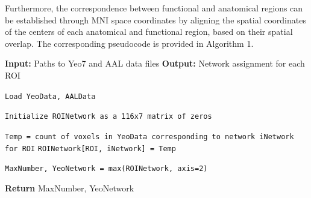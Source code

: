 \documentclass[lettersize,journal]{IEEEtran}
\begin{document}
Furthermore, the correspondence between functional and anatomical regions can be established through MNI space coordinates by aligning the spatial coordinates of the centers of each anatomical and functional region, based on their spatial overlap. The corresponding pseudocode is provided in Algorithm 1.

\begin{algorithm}
\caption{Mapping ROIs to Yeo7 Networks}
\begin{algorithmic}[1]
\State \textbf{Input:} Paths to Yeo7 and AAL data files
\State \textbf{Output:} Network assignment for each ROI

\State \texttt{Load YeoData, AALData}

\State \texttt{Initialize ROINetwork as a 116x7 matrix of zeros}

        \State \texttt{Temp = count of voxels in YeoData corresponding to network iNetwork for ROI}
        \State \texttt{ROINetwork[ROI, iNetwork] = Temp}
    \EndFor
\EndFor

\State \texttt{MaxNumber, YeoNetwork = max(ROINetwork, axis=2)}

\State \textbf{Return} MaxNumber, YeoNetwork
\end{algorithmic}
\end{algorithm}
\end{document}
